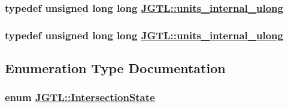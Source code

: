 \hypertarget{namespace_j_g_t_l_1924d6fd42e2d9661bc0b5a5063b99b3}{
\subsubsection[units\_\-internal\_\-ulong]{\setlength{\rightskip}{0pt plus 5cm}typedef unsigned long long \hyperlink{namespace_j_g_t_l_1924d6fd42e2d9661bc0b5a5063b99b3}{JGTL::units\_\-internal\_\-ulong}}}
\label{namespace_j_g_t_l_1924d6fd42e2d9661bc0b5a5063b99b3}


\hypertarget{namespace_j_g_t_l_1924d6fd42e2d9661bc0b5a5063b99b3}{
\subsubsection[units\_\-internal\_\-ulong]{\setlength{\rightskip}{0pt plus 5cm}typedef unsigned long long \hyperlink{namespace_j_g_t_l_1924d6fd42e2d9661bc0b5a5063b99b3}{JGTL::units\_\-internal\_\-ulong}}}
\label{namespace_j_g_t_l_1924d6fd42e2d9661bc0b5a5063b99b3}




\subsection{Enumeration Type Documentation}
\hypertarget{namespace_j_g_t_l_84ea7d7d885581de216d16c16850615a}{
\subsubsection[IntersectionState]{\setlength{\rightskip}{0pt plus 5cm}enum \hyperlink{namespace_j_g_t_l_84ea7d7d885581de216d16c16850615a}{JGTL::Intersection\-State}}}
\label{namespace_j_g_t_l_84ea7d7d885581de216d16c16850615a}


